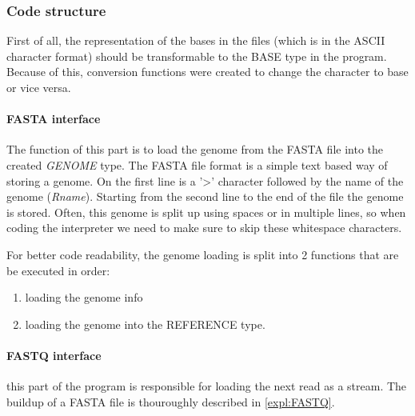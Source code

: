 \subsubsection{Code structure}

First of all, the representation of the bases in the files (which is in the ASCII character format) should be transformable to the BASE type in the program. Because of this, conversion functions were created to change the character to base or vice versa.

\paragraph{FASTA interface} The function of this part is to load the genome from the FASTA file into the created \emph{GENOME} type. 
The FASTA file format is a simple text based way of storing a genome. On the first line is a '>' character followed by the name of the genome (\emph{Rname}). Starting from the second line to the end of the file the genome is stored. Often, this genome is split up using spaces or in multiple lines, so when coding the interpreter we need to make sure to skip these whitespace characters.

For better code readability, the genome loading is split into 2 functions that are be executed in order:
\begin{enumerate}
	\item loading the genome info
	\item loading the genome into the REFERENCE type. 
\end{enumerate}

\paragraph{FASTQ interface} this part of the program is responsible for loading the next read as a stream. The buildup of a FASTA file is thouroughly described in \ref{expl:FASTQ}.

